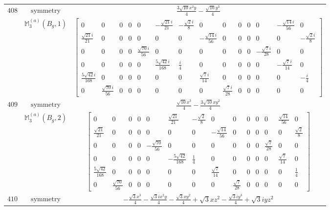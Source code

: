 \documentclass[fleqn,8pt,landscape]{jsarticle}
\begin{document}
\begin{longtable}{ccc}
$ 408 $ & $ \text{symmetry} $ & $ \frac{3 \sqrt{10} x^{2} y}{4} - \frac{\sqrt{10} y^{3}}{4} $ \\
$  $ & $ \mathbb{M}_{3}^{(a)}(B_{g},1) $ & $ \begin{bmatrix} 0 & 0 & 0 & 0 & 0 & - \frac{\sqrt{21} i}{21} & - \frac{\sqrt{2} i}{8} & 0 & 0 & 0 & 0 & 0 & - \frac{\sqrt{14} i}{56} & 0 \\ \frac{\sqrt{21} i}{21} & 0 & 0 & 0 & 0 & 0 & 0 & - \frac{\sqrt{14} i}{56} & 0 & 0 & 0 & 0 & 0 & - \frac{\sqrt{2} i}{8} \\ 0 & 0 & 0 & 0 & \frac{\sqrt{70} i}{56} & 0 & 0 & 0 & 0 & 0 & 0 & - \frac{\sqrt{7} i}{28} & 0 & 0 \\ 0 & 0 & 0 & 0 & 0 & \frac{5 \sqrt{42} i}{168} & \frac{i}{4} & 0 & 0 & 0 & 0 & 0 & - \frac{\sqrt{7} i}{14} & 0 \\ \frac{5 \sqrt{42} i}{168} & 0 & 0 & 0 & 0 & 0 & 0 & \frac{\sqrt{7} i}{14} & 0 & 0 & 0 & 0 & 0 & - \frac{i}{4} \\ 0 & \frac{\sqrt{70} i}{56} & 0 & 0 & 0 & 0 & 0 & 0 & \frac{\sqrt{7} i}{28} & 0 & 0 & 0 & 0 & 0 \end{bmatrix} $ \\ \hline
$ 409 $ & $ \text{symmetry} $ & $ \frac{\sqrt{10} x^{3}}{4} - \frac{3 \sqrt{10} x y^{2}}{4} $ \\
$  $ & $ \mathbb{M}_{3}^{(a)}(B_{g},2) $ & $ \begin{bmatrix} 0 & 0 & 0 & 0 & 0 & \frac{\sqrt{21}}{21} & - \frac{\sqrt{2}}{8} & 0 & 0 & 0 & 0 & 0 & \frac{\sqrt{14}}{56} & 0 \\ \frac{\sqrt{21}}{21} & 0 & 0 & 0 & 0 & 0 & 0 & - \frac{\sqrt{14}}{56} & 0 & 0 & 0 & 0 & 0 & \frac{\sqrt{2}}{8} \\ 0 & 0 & 0 & 0 & - \frac{\sqrt{70}}{56} & 0 & 0 & 0 & 0 & 0 & 0 & \frac{\sqrt{7}}{28} & 0 & 0 \\ 0 & 0 & 0 & 0 & 0 & - \frac{5 \sqrt{42}}{168} & \frac{1}{4} & 0 & 0 & 0 & 0 & 0 & \frac{\sqrt{7}}{14} & 0 \\ \frac{5 \sqrt{42}}{168} & 0 & 0 & 0 & 0 & 0 & 0 & \frac{\sqrt{7}}{14} & 0 & 0 & 0 & 0 & 0 & \frac{1}{4} \\ 0 & \frac{\sqrt{70}}{56} & 0 & 0 & 0 & 0 & 0 & 0 & \frac{\sqrt{7}}{28} & 0 & 0 & 0 & 0 & 0 \end{bmatrix} $ \\ \hline
$ 410 $ & $ \text{symmetry} $ & $ - \frac{\sqrt{3} x^{3}}{4} - \frac{\sqrt{3} i x^{2} y}{4} - \frac{\sqrt{3} x y^{2}}{4} + \sqrt{3} x z^{2} - \frac{\sqrt{3} i y^{3}}{4} + \sqrt{3} i y z^{2} $ \\

\end{longtable}
\end{document}
